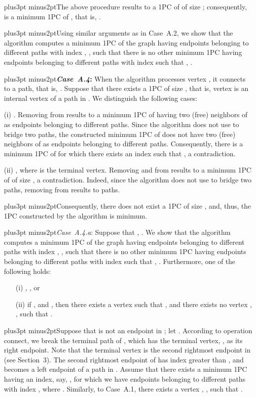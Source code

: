 \documentclass[10pt]{article}
\def\yskip{\penalty-50\vskip3pt plus3pt minus2pt}
\def\y{\yskip}
\begin{document}
{\y The above procedure results to a 1PC of  of size
;
consequently,  is a minimum 1PC of
, that is, .

\y Using similar arguments as in Case~A.2, we show that the
algorithm computes a minimum 1PC  of
the graph  having  endpoints 
belonging to different paths with index , , such that there is no other minimum 1PC
 having 
endpoints  belonging to different paths with index
 such that
, .

\y {\bf \textit{Case~A.4}:} When the algorithm processes vertex
, it connects  to a path, that is,
. Suppose that
there exists a 1PC  of size
, that is, vertex  is an
internal vertex of a path  in .
We distinguish the following cases:

(i) . Removing
 from  results to a minimum 1PC of  having two
(free) neighbors of  as endpoints belonging to different
paths. Since the algorithm does not use  to bridge two paths,
the constructed minimum 1PC of  does not have two (free)
neighbors of  as endpoints belonging to different paths.
Consequently, there is a minimum 1PC of  for which there
exists an index  such that
, a contradiction.

(ii) , where  is the terminal
vertex.  Removing  and  from  results to a minimum
1PC of  of size , a
contradiction. Indeed, since the algorithm does not use  to
bridge two paths, removing  from  results to
 paths.

\y Consequently, there does not exist a 1PC
 of size
, and, thus, the 1PC constructed by
the algorithm is minimum.

\y \textit{Case~A.4.a}: Suppose that , . We show that the
algorithm computes a minimum 1PC  of
the graph  having  endpoints 
belonging to different paths with index , , such that there is no other minimum 1PC
 having 
endpoints  belonging to different paths with index
 such that
, .
Furthermore, one of the following holds:
\begin{itemize}
\item[(i)] ,
, or \item[(ii)] if ,  and
,  then there exists a vertex  such that
, 
and there exists no vertex , , such
that .

\end{itemize}

\y Suppose that  is not an endpoint in
; let . According to operation connect, we break the terminal
path of , which has the terminal
vertex, , as its right endpoint. Note that the terminal
vertex is the second rightmost endpoint in
 (see Section~3). The second
rightmost endpoint of  has index
greater than , and  becomes a left endpoint of a path in
. Assume that there exists a minimum
1PC  having an index, say, ,
for which we have  endpoints
 belonging to different paths with index , where
. Similarly, to
Case~A.1, there exists a vertex , , such that
.

}
\end{document}
